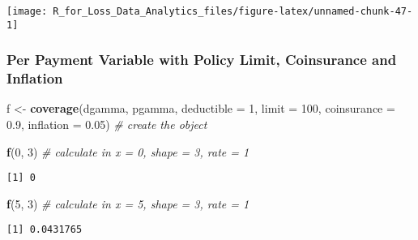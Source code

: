 \documentclass[]{book}
\newenvironment{Shaded}{\begin{snugshade}}{\end{snugshade}}
\newcommand{\KeywordTok}[1]{\textcolor[rgb]{0.13,0.29,0.53}{\textbf{#1}}}
\newcommand{\DataTypeTok}[1]{\textcolor[rgb]{0.13,0.29,0.53}{#1}}
\newcommand{\DecValTok}[1]{\textcolor[rgb]{0.00,0.00,0.81}{#1}}
\newcommand{\FloatTok}[1]{\textcolor[rgb]{0.00,0.00,0.81}{#1}}
\newcommand{\StringTok}[1]{\textcolor[rgb]{0.31,0.60,0.02}{#1}}
\newcommand{\CommentTok}[1]{\textcolor[rgb]{0.56,0.35,0.01}{\textit{#1}}}
\newcommand{\NormalTok}[1]{#1}
\theoremstyle{definition}
\theoremstyle{definition}
\theoremstyle{definition}
\theoremstyle{remark}
\begin{document}
\begin{center}\texttt{[image: R\_for\_Loss\_Data\_Analytics\_files/figure-latex/unnamed-chunk-47-1]} \end{center}

\subsubsection{Per Payment Variable with Policy Limit, Coinsurance and
Inflation}\label{per-payment-variable-with-policy-limit-coinsurance-and-inflation}

\begin{Shaded}
\begin{Highlighting}[]
\NormalTok{f <-}\StringTok{ }\KeywordTok{coverage}\NormalTok{(dgamma, pgamma, }\DataTypeTok{deductible =} \DecValTok{1}\NormalTok{, }\DataTypeTok{limit =} \DecValTok{100}\NormalTok{, }
              \DataTypeTok{coinsurance =} \FloatTok{0.9}\NormalTok{, }\DataTypeTok{inflation =} \FloatTok{0.05}\NormalTok{)  }
         \CommentTok{# create the object}

\KeywordTok{f}\NormalTok{(}\DecValTok{0}\NormalTok{, }\DecValTok{3}\NormalTok{)  }\CommentTok{# calculate in x = 0, shape = 3, rate = 1}
\end{Highlighting}
\end{Shaded}

\begin{verbatim}
[1] 0
\end{verbatim}

\begin{Shaded}
\begin{Highlighting}[]
\KeywordTok{f}\NormalTok{(}\DecValTok{5}\NormalTok{, }\DecValTok{3}\NormalTok{)  }\CommentTok{# calculate in x = 5, shape = 3, rate = 1}
\end{Highlighting}
\end{Shaded}

\begin{verbatim}
[1] 0.0431765
\end{verbatim}
\end{document}
